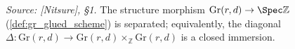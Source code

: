 \begin{lemma}

  \label{lem:gr_separated}
  \textit{Source: [Nitsure], \S 1.}
  The structure morphism \(\mathrm{Gr}(r,d) \to \Spec \mathbb{Z}\)
  (\cref{def:gr_glued_scheme}) is separated; equivalently, the diagonal
  \(\Delta : \mathrm{Gr}(r,d) \to \mathrm{Gr}(r,d) \times_{\mathbb{Z}}
  \mathrm{Gr}(r,d)\) is a closed immersion.
\end{lemma}

